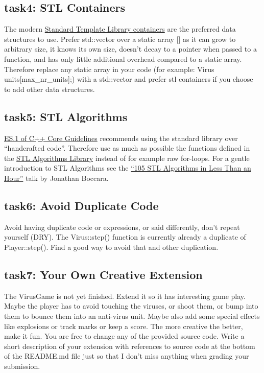 \documentclass[12pt]{article}
\begin{document}
\subsection{task4: STL Containers}
The modern \href{http://www.cplusplus.com/reference/stl/}{Standard
  Template Library containers} are the preferred data structures to
use. Prefer std::vector over a static array [] as it can grow to
arbitrary size, it knows its own size, doesn't decay to a pointer when
passed to a function, and has only little additional overhead compared
to a static array. Therefore replace any static array in your code
(for example: Virus units[max\_nr\_units];) with a std::vector and
prefer stl containers if you choose to add other data structures.

\subsection{task5: STL Algorithms}
\href{https://isocpp.github.io/CppCoreGuidelines/CppCoreGuidelines#Res-lib}
{ES.1 of C++ Core Guidelines} recommends using the standard library
over ``handcrafted code''.  Therefore use as much as possible the
functions defined in the
\href{https://en.cppreference.com/w/cpp/algorithm} {STL Algorithms
  Library} instead of for example raw for-loops. For a gentle
introduction to STL Algorithms see the
\href{https://www.youtube.com/watch?v=2olsGf6JIkU} {``105 STL Algorithms
  in Less Than an Hour''} talk by Jonathan Boccara.

\subsection{task6: Avoid Duplicate Code}
Avoid having duplicate code or expressions, or said differently, don't
repeat yourself (DRY). The Virus::step() function is currently already
a duplicate of Player::step(). Find a good way to avoid that and other
duplication.

\subsection{task7: Your Own Creative Extension}
The VirusGame is not yet finished. Extend it so it has interesting
game play. Maybe the player has to avoid touching the viruses, or
shoot them, or bump into them to bounce them into an anti-virus
unit. Maybe also add some special effects like explosions or track
marks or keep a score. The more creative the better, make it fun. You
are free to change any of the provided source code. Write a short
description of your extension with references to source code at the
bottom of the README.md file just so that I don't miss anything when
grading your submission.
\end{document}
